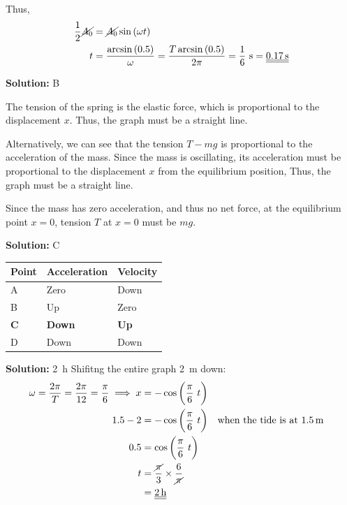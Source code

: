 \documentclass[11pt]{article}
\def\doubleunderline#1{\underline{\underline{#1}}}
\newcommand{\solution}[1]{\textbf{Solution: } #1 \hspace{5mm}}
\begin{document}
\begin{enumerate}[label={[D\arabic*]},itemsep={1em}]
			Thus,
			\begin{align*}
				\frac{1}{2}\cancel{A_0} &= \cancel{A_0} \sin\left(\omega t\right) \\
				t &= \frac{\arcsin\left(0.5\right)}{\omega} = \frac{T\arcsin\left(0.5\right)}{2\pi} = \frac{1}{6}~\si{\second} = \doubleunderline{\SI{0.17}{\second}}
			\end{align*}
		
		\item \solution{B}
		
			The tension of the spring is the elastic force, which is proportional to the displacement $x$. Thus, the graph must be a straight line. 
			
			Alternatively, we can see that the tension $T-mg$ is proportional to the acceleration of the mass. Since the mass is oscillating, its acceleration must be proportional to the displacement $x$ from the equilibrium position, Thus, the graph must be a straight line.
			
			Since the mass has zero acceleration, and thus no net force, at the equilibrium point $x = 0$, tension $T$ at $x = 0$ must be $mg$.
		
		\item \solution{C}
			\begin{center}
				\begin{tabular}{lll}
					\toprule
					Point & Acceleration & Velocity \\
					\midrule
					A & Zero & Down\\
					B & Up & Zero\\
					\textbf{C} & \textbf{Down} & \textbf{Up}\\
					D & Down & Down\\
					\bottomrule
				\end{tabular}
			\end{center}
		
		\item \solution{\SI{2}{\hour}}
			Shifitng the entire graph \SI{2}{\meter} down:
			\begin{align*}
				\omega = \frac{2\pi}{T} = \frac{2\pi}{12} = \frac{\pi}{6} \implies x &= -\cos\left(\frac{\pi}{6}~t\right) \\
				1.5 - 2 &= -\cos\left(\frac{\pi}{6}~t\right) && \text{when the tide is at \SI{1.5}{\meter}} \\
				0.5 &=  \cos\left(\frac{\pi}{6}~t\right) \\
				t &= \frac{\cancel{\pi}}{3} \times \frac{6}{\cancel{\pi}} \\
				&= \doubleunderline{\SI{2}{\hour}}
			\end{align*}
		

\end{enumerate}
\end{document}
